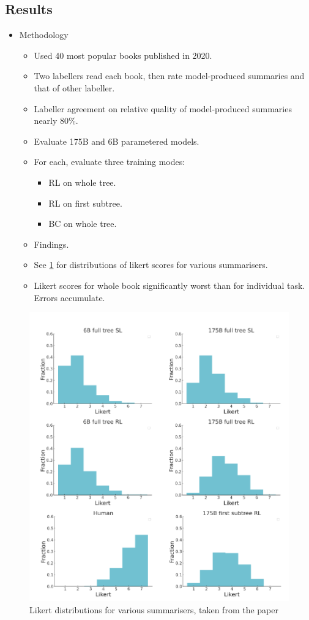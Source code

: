 \subsection{Results}

\begin{itemize}
    \item Methodology
    \begin{itemize}
        \item Used 40 most popular books published in 2020.
        \item Two labellers read each book, then rate model-produced summaries and that of other labeller.
        \item Labeller agreement on relative quality of model-produced summaries nearly 80\%.
        \item Evaluate 175B and 6B parametered models.
        \item For each, evaluate three training modes:
        \begin{itemize}
            \item RL on whole tree.
            \item RL on first subtree.
            \item BC on whole tree.
        \end{itemize}
        \item Findings.
    \end{itemize}
    \begin{itemize}
        \item See \cref{fig:likert} for distributions of likert scores for various summarisers.
        \item Likert scores for whole book significantly worst than for individual task. Errors accumulate.
    \end{itemize}
\end{itemize}

\begin{figure}
    \centering
    \includegraphics[width=.95\linewidth]{images/likert-distros.png}
    \caption{Likert distributions for various summarisers, taken from the paper}
    \label{fig:likert}
\end{figure}
